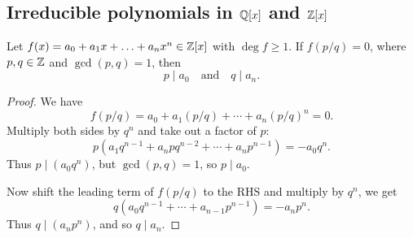 \documentclass[10pt, a4paper]{article}
\begin{document}
\subsection{Irreducible polynomials in \texorpdfstring{$\mathbb{Q}[x]$}{} and \texorpdfstring{$\mathbb{Z}[x]$}{}}

\begin{proposition}
    Let $f(x) = a_0 + a_1x + \dotsc + a_nx ^ n \in \mathbb{Z}[x]$ with $\deg{f} \geq 1$.
    If $f(p / q) = 0$,
    where $p, q \in \mathbb{Z}$ and $\gcd(p, q) = 1$,
    then
    \[
    p \mid a_0\quad\text{and}\quad q \mid a_n.
    \]

    \begin{proof}
        We have
        \[
        f(p / q) = a_0 + a_1(p / q) + \dotsi + a_n(p / q) ^ n = 0.
        \]
        Multiply both sides by $q ^ n$ and take out a factor of $p$:
        \[
        p(a_1q ^ {n - 1} + a_npq ^ {n - 2} +  \dotsi + a_np ^ {n - 1}) = -a_0q ^ n.
        \]
        Thus $p \mid (a_0q ^ n)$,
        but $\gcd(p, q) = 1$,
        so $p \mid a_0$.

        Now shift the leading term of $f(p / q)$ to the RHS and multiply by $q ^ n$,
        we get
        \[
        q(a_0q ^ {n - 1} + \dotsi + a_{n - 1}p ^ {n - 1}) = -a_np ^ n.
        \]
        Thus $q \mid (a_np ^ n)$,
        and so $q \mid a_n$.
    \end{proof}
\end{proposition}
\end{document}
